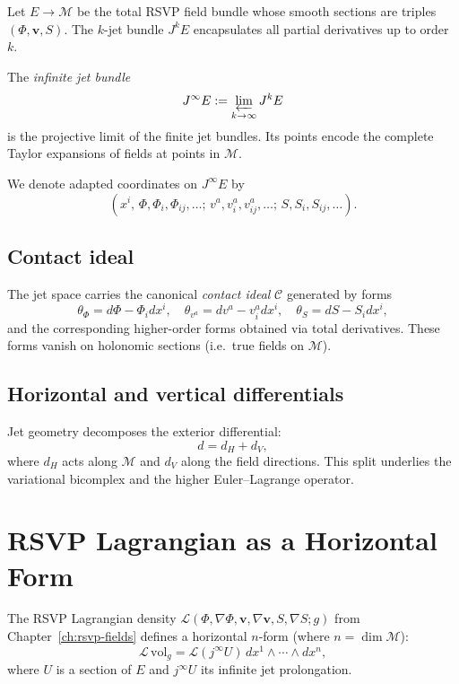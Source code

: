 Let $E\to\mathcal{M}$ be the total RSVP field bundle whose smooth sections are
triples $(\Phi,\mathbf{v},S)$.  
The $k$-jet bundle $J^kE$ encapsulates all partial derivatives up to order $k$.

\begin{definition}
The \emph{infinite jet bundle}
\[
J^\infty E := \varprojlim_{k\to\infty} J^k E
\]
is the projective limit of the finite jet bundles.  Its points encode the
complete Taylor expansions of fields at points in $\mathcal{M}$.
\end{definition}

We denote adapted coordinates on $J^\infty E$ by
\[
(x^i,\,
\Phi,\Phi_i,\Phi_{ij},\ldots;\,
v^a, v^a_i,v^a_{ij},\ldots;\,
S,S_i,S_{ij},\ldots).
\]

\subsection{Contact ideal}

The jet space carries the canonical \emph{contact ideal} $\mathcal{C}$ generated
by forms
\[
\theta_\Phi = d\Phi - \Phi_i dx^i,
\quad
\theta_{v^a} = dv^a - v^a_i dx^i,
\quad
\theta_S = dS - S_i dx^i,
\]
and the corresponding higher-order forms obtained via total derivatives.  These
forms vanish on holonomic sections (i.e.\ true fields on $\mathcal{M}$).

\subsection{Horizontal and vertical differentials}

Jet geometry decomposes the exterior differential:
\[
d = d_H + d_V,
\]
where $d_H$ acts along $\mathcal{M}$ and $d_V$ along the field directions.
This split underlies the variational bicomplex and the higher Euler--Lagrange
operator.

\section{RSVP Lagrangian as a Horizontal Form}

The RSVP Lagrangian density $\mathcal{L}(\Phi,\nabla\Phi,\mathbf{v},
\nabla\mathbf{v},S,\nabla S;g)$ from Chapter~\ref{ch:rsvp-fields} defines a
horizontal $n$-form (where $n=\dim\mathcal{M}$):
\[
\mathcal{L}\, \mathrm{vol}_g
= \mathcal{L}(j^\infty U)\, dx^1\wedge\cdots\wedge dx^n,
\]
where $U$ is a section of $E$ and $j^\infty U$ its infinite jet prolongation.

